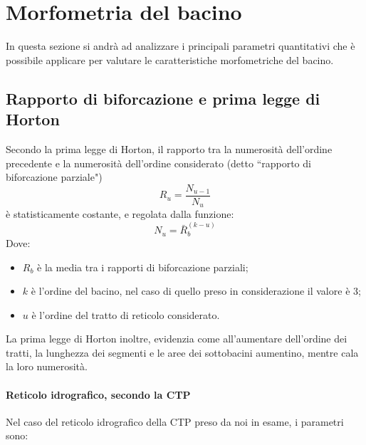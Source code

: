 \section{Morfometria del bacino}
In questa sezione si andrà ad analizzare i principali parametri quantitativi che è possibile applicare per valutare le caratteristiche morfometriche del bacino.
\subsection{Rapporto di biforcazione e prima legge di Horton}
Secondo la prima legge di Horton, il rapporto tra la numerosità dell'ordine precedente e la numerosità dell'ordine considerato (detto ``rapporto di biforcazione parziale")
\begin{equation}
    R_u = \frac{N_{u-1}}{N_u}
\end{equation}
è statisticamente costante, e regolata dalla funzione:
\begin{equation}
    N_u= \bar{R}_b ^{(k-u)}
\end{equation}
Dove: 
\begin{itemize}
    \item $R_b$ è la media tra i rapporti di biforcazione parziali;
    \item $k$ è l'ordine del bacino, nel caso di quello preso in considerazione il valore è 3;
    \item $u$ è l'ordine del tratto di reticolo considerato.
\end{itemize}
La prima legge di Horton inoltre, evidenzia come all'aumentare dell'ordine dei tratti, la lunghezza dei segmenti e le aree dei sottobacini aumentino, mentre cala la loro numerosità.\\
\paragraph{Reticolo idrografico, secondo la CTP} Nel caso del reticolo idrografico della CTP preso da noi in esame, i parametri sono: 

